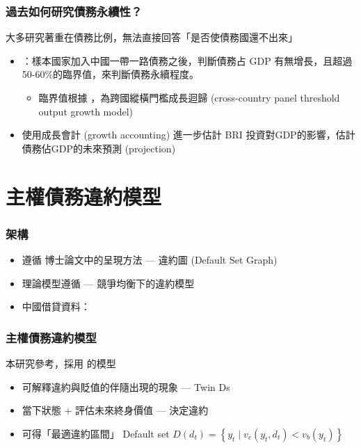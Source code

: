 \documentclass[mathserif]{beamer}
\begin{document}
    \begin{frame}
        \frametitle{過去如何研究債務永續性？}
            大多研究著重在債務比例，無法直接回答「是否使債務國還不出來」
            \vfill
            \pause
            \begin{itemize}
            \item \citet{Hurley19-8-debt-trap}：樣本國家加入中國一帶一路債務之後，判斷債務占 GDP 有無增長，且超過50-60\%的臨界值，來判斷債務永續程度。
                \begin{itemize}
                    \item 臨界值根據 \citet{Chudik-15}，為跨國縱橫門檻成長迴歸 (cross-country panel threshold output growth model)
                \end{itemize}
            \item \citet{Bandiera-Vasileios-BRI-debt} 使用成長會計 (growth accounting) 進一步估計 BRI 投資對GDP的影響，估計債務佔GDP的未來預測 (projection)
            \end{itemize}
    \end{frame}

    \section{主權債務違約模型}
    \begin{frame}
        \frametitle{架構}
        \begin{itemize}
            \item 遵循 \citet{Hinrichsen_2020-chapter4}博士論文中的呈現方法 --- 違約圖 (Default Set Graph)
            \item 理論模型遵循 \citet*{Na-18} --- 競爭均衡下的違約模型
            \item 中國借貸資料：\citet*{Horn-Reinhart-Trebesch-21}
        \end{itemize}
    \end{frame}

    \begin{frame}
        \frametitle{主權債務違約模型}
        本研究參考\citet{Hinrichsen_2020-chapter4}，採用 \citet{Na-18} 的模型
        \begin{itemize}
            \item 可解釋違約與貶值的伴隨出現的現象 --- Twin Ds
            \item 當下狀態 + 評估未來終身價值 --- 決定違約
            \item 可得「最適違約區間」 Default set $D(d_t) = \left\{ y_t \mid v_c(y_t, d_t) < v_b(y_t) \right\}$
        \end{itemize}
    \end{frame}
\end{document}
